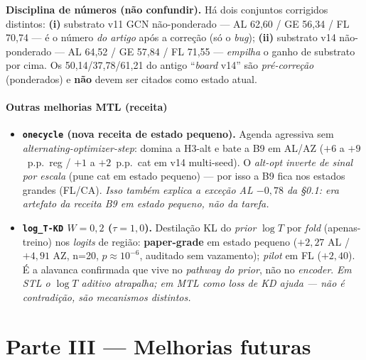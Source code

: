\documentclass[11pt,a4paper]{article}
\newcommand{\note}[1]{\textcolor{black!55}{\textit{#1}}}
\begin{document}
\medskip
\noindent\textbf{Disciplina de números (não confundir).} Há dois conjuntos corrigidos distintos:
\textbf{(i)} substrato v11 GCN não-ponderado --- AL 62,60 / GE 56,34 / FL 70,74 --- é o número
\emph{do artigo} após a correção (só o \textit{bug}); \textbf{(ii)} substrato v14 não-ponderado ---
AL 64,52 / GE 57,84 / FL 71,55 --- \emph{empilha} o ganho de substrato por cima. Os 50,14/37,78/61,21
do antigo ``\textit{board} v14'' são \emph{pré-correção} (ponderados) e \textbf{não} devem ser citados
como estado atual.

\subsection{Outras melhorias MTL (receita)}\label{sec:mtl-outras}

\begin{itemize}[leftmargin=*,noitemsep]
\item \textbf{\texttt{onecycle} (nova receita de estado pequeno).} Agenda agressiva sem
\textit{alternating-optimizer-step}: domina a H3-alt e bate a B9 em AL/AZ ($+6$ a $+9$~p.p.\ reg /
$+1$ a $+2$~p.p.\ cat em v14 multi-seed). O \textit{alt-opt} \emph{inverte de sinal por escala} (pune
cat em estado pequeno) --- por isso a B9 fica nos estados grandes (FL/CA). \note{Isso também explica a
exceção AL $-0{,}78$ da \S0.1: era artefato da receita B9 em estado pequeno, não da tarefa.}
\item \textbf{\texttt{log\_T-KD} $W{=}0{,}2$ ($\tau{=}1{,}0$).} Destilação KL do \textit{prior}
$\log T$ por \textit{fold} (apenas-treino) nos \textit{logits} de região: \textbf{paper-grade} em
estado pequeno ($+2{,}27$ AL / $+4{,}91$ AZ, n=20, $p\approx10^{-6}$, auditado sem vazamento);
\textit{pilot} em FL ($+2{,}40$). É a alavanca confirmada que vive no \emph{pathway do prior}, não no
\textit{encoder}. \note{Em STL o $\log T$ aditivo atrapalha; em MTL como \textit{loss} de KD ajuda ---
não é contradição, são mecanismos distintos.}
\end{itemize}

\part*{Parte III --- Melhorias futuras}

\end{document}
